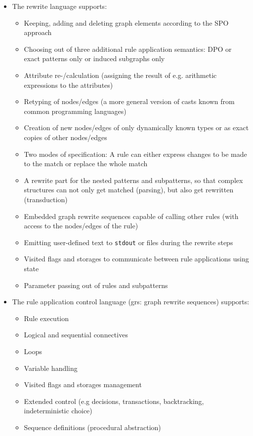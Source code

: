 \begin{itemize}
  \item The rewrite language supports:
  \begin{itemize}
    \item Keeping, adding and deleting graph elements according to the SPO approach
	\item Choosing out of three additional rule application semantics: DPO or exact patterns only or induced subgraphs only
    \item Attribute re-/calculation (assigning the result of e.g. arithmetic expressions to the attributes)
    \item Retyping of nodes/edges (a more general version of casts known from common programming languages)
    \item Creation of new nodes/edges of only dynamically known types or as exact copies of other nodes/edges
	\pagebreak
    \item Two modes of specification: A rule can either express changes to be made to the match or replace the whole match
    \item A rewrite part for the nested patterns and subpatterns, so that complex structures can not only get matched (parsing), but also get rewritten (transduction)
    \item Embedded graph rewrite sequences capable of calling other rules (with access to the nodes/edges of the rule)
    \item Emitting user-defined text to \texttt{stdout} or files during the rewrite steps
	\item Visited flags and storages to communicate between rule applications using state
    \item Parameter passing out of rules and subpatterns
  \end{itemize}

  \item The rule application control language (grs: graph rewrite sequences) supports:
  \begin{itemize}
    \item Rule execution
    \item Logical and sequential connectives
    \item Loops
    \item Variable handling
    \item Visited flags and storages management
    \item Extended control (e.g decisions, transactions, backtracking, indeterministic choice)
    \item Sequence definitions (procedural abstraction)
  \end{itemize}
\end{itemize}

